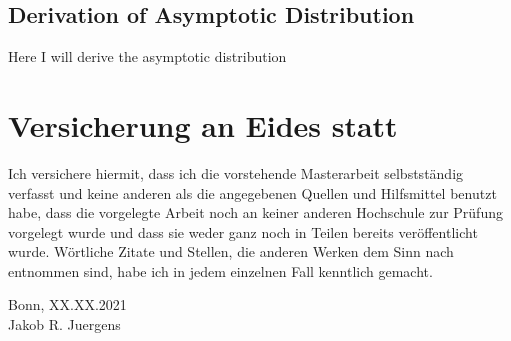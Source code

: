 \documentclass[12pt, a4paper]{article}
\theoremstyle{MAstyle} \newtheorem{assumption}{Assumption}[section]
\theoremstyle{MAstyle} \newtheorem{definition}{Definition}[section]
\begin{document}
		\subsection{Derivation of Asymptotic Distribution}\label{asymp_deriv}
			Here I will derive the asymptotic distribution
	\newpage
	\thispagestyle{empty}
	\section*{Versicherung an Eides statt}	
	
		\vspace{3cm}
		
		Ich versichere hiermit, dass ich die vorstehende Masterarbeit
		selbstständig verfasst und keine anderen als die angegebenen Quellen
		und Hilfsmittel benutzt habe, dass die vorgelegte Arbeit noch an keiner
		anderen Hochschule zur Prüfung vorgelegt wurde und dass sie weder
		ganz noch in Teilen bereits veröffentlicht wurde. Wörtliche Zitate und
		Stellen, die anderen Werken dem Sinn nach entnommen sind, habe ich
		in jedem einzelnen Fall kenntlich gemacht.
		
		\vspace{2cm}
		Bonn, XX.XX.2021 \hrulefill \\
		\hspace*{0mm}Jakob R. Juergens
		
		\vspace{\fill}
\end{document}

